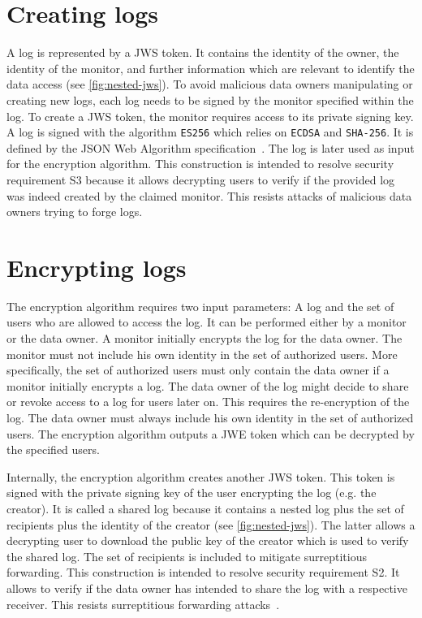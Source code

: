 \documentclass[../main.tex]{subfiles}
\begin{document}
\section{Creating logs}
\label{sec:signing}
A log is represented by a JWS token.
It contains the identity of the owner, the identity of the monitor, and further information which are relevant to identify the data access (see \cref{fig:nested-jws}).
To avoid malicious data owners manipulating or creating new logs, each log needs to be signed by the monitor specified within the log.
To create a JWS token, the monitor requires access to its private signing key.
A log is signed with the algorithm \verb|ES256| which relies on \verb|ECDSA| and \verb|SHA-256|.
It is defined by the JSON Web Algorithm specification~\cite{JWA2015}.
The log is later used as input for the encryption algorithm.
This construction is intended to resolve security requirement S3 because it allows decrypting users to verify if the provided log was indeed created by the claimed monitor.
This resists attacks of malicious data owners trying to forge logs.

\section{Encrypting logs}\label{sec:encrypting}

The encryption algorithm requires two input parameters: A log and the set of users who are allowed to access the log.
It can be performed either by a monitor or the data owner.
A monitor initially encrypts the log for the data owner.
The monitor must not include his own identity in the set of authorized users.
More specifically, the set of authorized users must only contain the data owner if a monitor initially encrypts a log.
The data owner of the log might decide to share or revoke access to a log for users later on.
This requires the re-encryption of the log.
The data owner must always include his own identity in the set of authorized users.
The encryption algorithm outputs a JWE token which can be decrypted by the specified users.

Internally, the encryption algorithm creates another JWS token.
This token is signed with the private signing key of the user encrypting the log (e.g. the creator).
It is called a shared log because it contains a nested log plus the set of recipients plus the identity of the creator (see \cref{fig:nested-jws}).
The latter allows a decrypting user to download the public key of the creator which is used to verify the shared log.
The set of recipients is included to mitigate surreptitious forwarding.
This construction is intended to resolve security requirement S2.
It allows to verify if the data owner has intended to share the log with a respective receiver.
This resists surreptitious forwarding attacks~\cite{Davis2001}.
\end{document}

